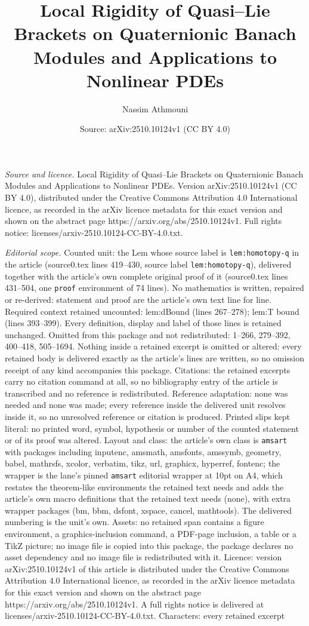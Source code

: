 \documentclass[10pt,a4paper]{amsart}
\title[Local Rigidity of Quasi--Lie Brackets on Quaternionic Banach]{Local Rigidity of Quasi--Lie Brackets on Quaternionic Banach Modules and Applications to Nonlinear PDEs}
\author{Nassim Athmouni}
\date{Source: arXiv:2510.10124v1 (CC BY 4.0)}
\begin{document}
\maketitle

\noindent\emph{Source and licence.} Local Rigidity of Quasi--Lie Brackets on Quaternionic Banach Modules and Applications to Nonlinear PDEs. Version arXiv:2510.10124v1 (CC BY 4.0), distributed under the Creative Commons Attribution 4.0 International licence, as recorded in the arXiv licence metadata for this exact version and shown on the abstract page https://arxiv.org/abs/2510.10124v1. Full rights notice: licenses/arxiv-2510.10124-CC-BY-4.0.txt.\par\smallskip

\noindent\textit{Editorial scope.} Counted unit: the Lem whose source label is \texttt{lem:homotopy-q} in the article (source0.tex lines 419--430, source label \texttt{lem:homotopy-q}), delivered together with the article's own complete original proof of it (source0.tex lines 431--504, one \texttt{proof} environment of 74 lines). No mathematics is written, repaired or re-derived: statement and proof are the article's own text line for line. Required context retained uncounted: lem:dBound (lines 267--278); lem:T bound (lines 393--399). Every definition, display and label of those lines is retained unchanged. Omitted from this package and not redistributed: 1--266, 279--392, 400--418, 505--1694. Nothing inside a retained excerpt is omitted or altered: every retained body is delivered exactly as the article's lines are written, so no omission receipt of any kind accompanies this package. Citations: the retained excerpts carry no citation command at all, so no bibliography entry of the article is transcribed and no reference is redistributed. Reference adaptation: none was needed and none was made; every reference inside the delivered unit resolves inside it, so no unresolved reference or citation is produced. Printed slips kept literal: no printed word, symbol, hypothesis or number of the counted statement or of its proof was altered. Layout and class: the article's own class is \texttt{amsart} with packages including inputenc, amsmath, amsfonts, amssymb, geometry, babel, mathrsfs, xcolor, verbatim, tikz, url, graphicx, hyperref, fontenc; the wrapper is the lane's pinned \texttt{amsart} editorial wrapper at 10pt on A4, which restates the theorem-like environments the retained text needs and adds the article's own macro definitions that the retained text needs (none), with extra wrapper packages (bm, bbm, dsfont, xspace, cancel, mathtools). The delivered numbering is the unit's own. Assets: no retained span contains a figure environment, a graphics-inclusion command, a PDF-page inclusion, a table or a TikZ picture; no image file is copied into this package, the package declares no asset dependency and no image file is redistributed with it. Licence: version arXiv:2510.10124v1 of this article is distributed under the Creative Commons Attribution 4.0 International licence, as recorded in the arXiv licence metadata for this exact version and shown on the abstract page https://arxiv.org/abs/2510.10124v1. A full rights notice is delivered at licenses/arxiv-2510.10124-CC-BY-4.0.txt. Characters: every retained excerpt 
\end{document}
